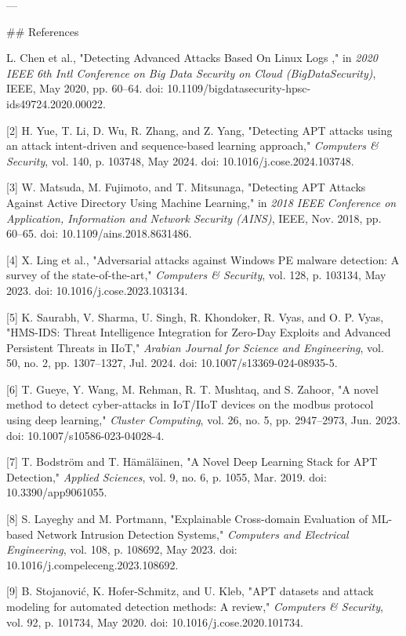 ---

\#\# References

\cite{karim2024linux} L. Chen et al., "Detecting Advanced Attacks Based On Linux Logs \cite{chen2020linux}," in \textit{2020 IEEE 6th Intl Conference on Big Data Security on Cloud (BigDataSecurity)}, IEEE, May 2020, pp. 60–64. doi: 10.1109/bigdatasecurity-hpsc-ids49724.2020.00022.

[2] H. Yue, T. Li, D. Wu, R. Zhang, and Z. Yang, "Detecting APT attacks using an attack intent-driven and sequence-based learning approach," \textit{Computers \& Security}, vol. 140, p. 103748, May 2024. doi: 10.1016/j.cose.2024.103748.

[3] W. Matsuda, M. Fujimoto, and T. Mitsunaga, "Detecting APT Attacks Against Active Directory Using Machine Learning," in \textit{2018 IEEE Conference on Application, Information and Network Security (AINS)}, IEEE, Nov. 2018, pp. 60–65. doi: 10.1109/ains.2018.8631486.

[4] X. Ling et al., "Adversarial attacks against Windows PE malware \cite{ling2023windows} detection: A survey of the state-of-the-art," \textit{Computers \& Security}, vol. 128, p. 103134, May 2023. doi: 10.1016/j.cose.2023.103134.

[5] K. Saurabh, V. Sharma, U. Singh, R. Khondoker, R. Vyas, and O. P. Vyas, "HMS-IDS: Threat Intelligence Integration for Zero-Day Exploits and Advanced Persistent Threats in IIoT," \textit{Arabian Journal for Science and Engineering}, vol. 50, no. 2, pp. 1307–1327, Jul. 2024. doi: 10.1007/s13369-024-08935-5.

[6] T. Gueye, Y. Wang, M. Rehman, R. T. Mushtaq, and S. Zahoor, "A novel method to detect cyber-attacks in IoT/IIoT devices on the modbus protocol using deep learning," \textit{Cluster Computing}, vol. 26, no. 5, pp. 2947–2973, Jun. 2023. doi: 10.1007/s10586-023-04028-4.

[7] T. Bodström and T. Hämäläinen, "A Novel Deep Learning Stack for APT Detection," \textit{Applied Sciences}, vol. 9, no. 6, p. 1055, Mar. 2019. doi: 10.3390/app9061055.

[8] S. Layeghy and M. Portmann, "Explainable Cross-domain Evaluation of ML-based Network Intrusion Detection Systems," \textit{Computers and Electrical Engineering}, vol. 108, p. 108692, May 2023. doi: 10.1016/j.compeleceng.2023.108692.

[9] B. Stojanović, K. Hofer-Schmitz, and U. Kleb, "APT datasets and attack modeling for automated detection methods: A review," \textit{Computers \& Security}, vol. 92, p. 101734, May 2020. doi: 10.1016/j.cose.2020.101734.
